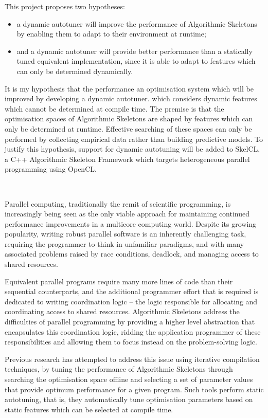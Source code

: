 This project proposes two hypotheses:
\begin{itemize}
\item a dynamic autotuner will improve the performance of Algorithmic
  Skeletons by enabling them to adapt to their environment at runtime;
\item and a dynamic autotuner will provide better performance than a
  statically tuned equivalent implementation, since it is able to
  adapt to features which can only be determined dynamically.
\end{itemize}

It is my hypothesis that the performance an optimisation system which
will be improved by developing a dynamic autotuner.  which considers
dynamic features which cannot be determined at compile time. The
premise is that the optimisation spaces of Algorithmic Skeletons are
shaped by features which can only be determined at runtime. Effective
searching of these spaces can only be performed by collecting
empirical data rather than building predictive models. To justify this
hypothesis, support for dynamic autotuning will be added to SkelCL, a
C++ Algorithmic Skeleton Framework which targets heterogeneous
parallel programming using OpenCL.

~\cite{Dean2008}
~\cite{IntelTBB}

Parallel computing, traditionally the remit of scientific programming,
is increasingly being seen as the only viable approach for maintaining
continued performance improvements in a multicore computing world.
Despite its growing popularity, writing robust parallel software is an
inherently challenging task, requiring the programmer to think in
unfamiliar paradigms, and with many associated problems raised by race
conditions, deadlock, and managing access to shared resources.

Equivalent parallel programs require many more lines of code than
their sequential counterparts, and the additional programmer effort
that is required is dedicated to writing coordination logic -- the
logic responsible for allocating and coordinating access to shared
resources. Algorithmic Skeletons address the difficulties of parallel
programming by providing a higher level abstraction that encapsulates
this coordination logic, ridding the application programmer of these
responsibilities and allowing them to focus instead on the
problem-solving logic.

Previous research has attempted to address this issue using iterative
compilation techniques, by tuning the performance of Algorithmic
Skeletons through searching the optimisation space offline and
selecting a set of parameter values that provide optimum performance
for a given program. Such tools perform static autotuning, that is,
they automatically tune optimisation parameters based on static
features which can be selected at compile time.

